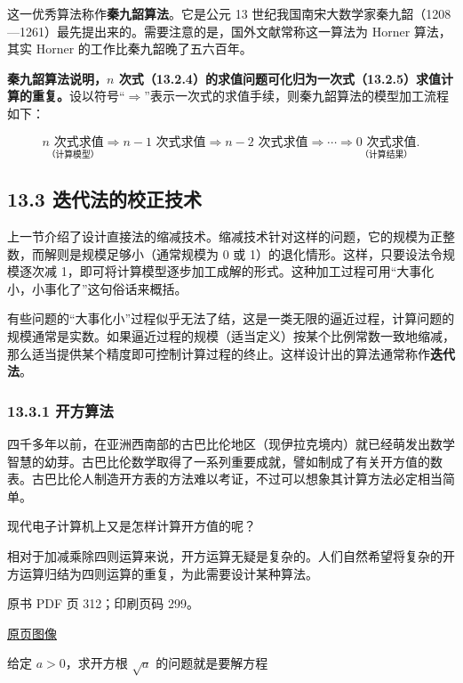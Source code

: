 这一优秀算法称作\textbf{秦九韶算法}。它是公元 13 世纪我国南宋大数学家秦九韶（1208---1261）最先提出来的。需要注意的是，国外文献常称这一算法为 Horner 算法，其实 Horner 的工作比秦九韶晚了五六百年。

\textbf{秦九韶算法说明，\(n\) 次式（13.2.4）的求值问题可化归为一次式（13.2.5）求值计算的重复。}设以符号``\(\Rightarrow\)''表示一次式的求值手续，则秦九韶算法的模型加工流程如下：

\[
\underset{\text{（计算模型）}}{n\text{ 次式求值}}
\Rightarrow n-1\text{ 次式求值}
\Rightarrow n-2\text{ 次式求值}
\Rightarrow\cdots\Rightarrow
\underset{\text{（计算结果）}}{0\text{ 次式求值}}.
\]

\subsection{13.3 迭代法的校正技术}\label{ch13-ux8fedux4ee3ux6cd5ux7684ux6821ux6b63ux6280ux672f}

上一节介绍了设计直接法的缩减技术。缩减技术针对这样的问题，它的规模为正整数，而解则是规模足够小（通常规模为 0 或 1）的退化情形。这样，只要设法令规模逐次减 1，即可将计算模型逐步加工成解的形式。这种加工过程可用``大事化小，小事化了''这句俗话来概括。

有些问题的``大事化小''过程似乎无法了结，这是一类无限的逼近过程，计算问题的规模通常是实数。如果逼近过程的规模（适当定义）按某个比例常数一致地缩减，那么适当提供某个精度即可控制计算过程的终止。这样设计出的算法通常称作\textbf{迭代法}。

\subsubsection{13.3.1 开方算法}\label{ch13-ux5f00ux65b9ux7b97ux6cd5}

四千多年以前，在亚洲西南部的古巴比伦地区（现伊拉克境内）就已经萌发出数学智慧的幼芽。古巴比伦数学取得了一系列重要成就，譬如制成了有关开方值的数表。古巴比伦人制造开方表的方法难以考证，不过可以想象其计算方法必定相当简单。

现代电子计算机上又是怎样计算开方值的呢？

相对于加减乘除四则运算来说，开方运算无疑是复杂的。人们自然希望将复杂的开方运算归结为四则运算的重复，为此需要设计某种算法。

\clearpage

原书 PDF 页 312；印刷页码 299。

\href{source-images/pdf-312.jpeg}{原页图像}

给定 \(a>0\)，求开方根 \(\sqrt{a}\) 的问题就是要解方程

